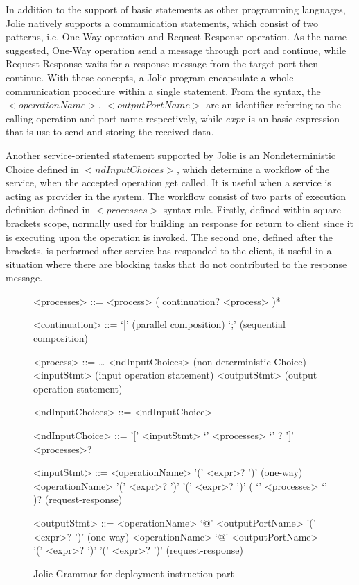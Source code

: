 In addition to the support of basic statements as other programming languages, Jolie natively supports a communication statements, which consist of two patterns, i.e. One-Way operation and Request-Response operation. As the name suggested, One-Way operation send a message through port and continue, while Request-Response waits for a response message from the target port then continue. With these concepts, a Jolie program encapsulate a whole communication procedure within a single statement. From the syntax, the \(<operationName>\), \(<outputPortName>\) are an identifier referring to the calling operation and port name respectively, while \(expr\) is an basic expression that is use to send and storing the received data.

Another service-oriented statement supported by Jolie is an Nondeterministic Choice defined in \(<ndInputChoices>\), which determine a workflow of the service, when the accepted operation get called. It is useful when a service is acting as provider in the system. The workflow consist of two parts of execution definition defined in \(<processes>\) syntax rule. Firstly, defined within square brackets scope, normally used for building an response for return to client since it is executing upon the operation is invoked. The second one, defined after the brackets, is performed after service has responded to the client, it useful in a situation where there are blocking tasks that do not contributed to the response message.

\begin{figure}[h]
    \begin{framed}
        \begin{grammar}
            <processes>
            ::= <process> ( continuation? <process> )*

            <continuation> ::= `|' \hfill (parallel composition)
            \alt `;' \hfill (sequential composition)

            <process> ::= \dots
            \alt <ndInputChoices> \hfill (non-deterministic Choice)
            \alt <inputStmt> \hfill (input operation statement)
            \alt <outputStmt> \hfill (output operation statement)

            <ndInputChoices>
            ::= <ndInputChoice>+

            <ndInputChoice>
            ::= '[' <inputStmt> `{' <processes> `}' ? ']' <processes>?
            
            <inputStmt>
            ::= <operationName> '(' <expr>? ')' \hfill (one-way)
            \alt
            <operationName> '(' <expr>? ')' '(' <expr>? ')' ( `{' <processes> `}' )? \hfill (request-response)

            <outputStmt>
            ::= <operationName> `@' <outputPortName> '(' <expr>? ')' \hfill (one-way)
            \alt
            <operationName> `@' <outputPortName> '(' <expr>? ')' '(' <expr>? ')' \hfill (request-response)
        \end{grammar}
    \end{framed}
    \caption{Jolie Grammar for deployment instruction part}
    \label{fig:jolie-process}
\end{figure}


